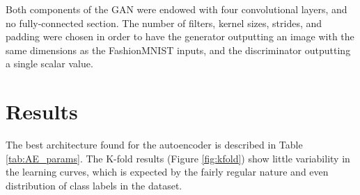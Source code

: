 \documentclass[11pt]{article} %
\begin{document}
\noindent Both components of the GAN were endowed with four convolutional layers, and no fully-connected section. The number of filters, kernel sizes, strides, and padding were chosen in order to have the generator outputting an image with the same dimensions as the FashionMNIST inputs, and the discriminator outputting a single scalar value.

\section*{Results}



\noindent The best architecture found for the autoencoder is described in Table \ref{tab:AE_params}. The K-fold results (Figure \ref{fig:kfold}) show little variability in the learning curves, which is expected by the fairly regular nature and even distribution of class labels in the dataset. 

\begin{table}
    \caption{Autoencoder architecture. The number of channels in \textsc{conv[i]} corresponds to output channels, while it corresponds to input channels in \textsc{Deconv[i]}.}
    \label{tab:AE_params}
\end{table}
\end{document}
